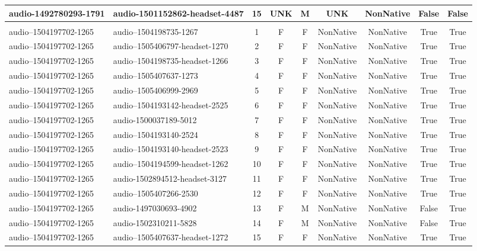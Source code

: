 {\begin{longtable}{p{2.1cm} p{2.1cm} c cccc cc}
audio-1492780293-1791 & audio-1501152862-headset-4487 & 15 & UNK & M & UNK & NonNative & False & False \\
\midrule
 &  &  &  &  &  &  &  & \\ %
\midrule
audio--1504197702-1265 & audio--1504198735-1267 & 1 & F & F & NonNative & NonNative & True & True \\
audio--1504197702-1265 & audio--1505406797-headset-1270 & 2 & F & F & NonNative & NonNative & True & True \\
audio--1504197702-1265 & audio--1504198735-headset-1266 & 3 & F & F & NonNative & NonNative & True & True \\
audio--1504197702-1265 & audio--1505407637-1273 & 4 & F & F & NonNative & NonNative & True & True \\
audio--1504197702-1265 & audio--1505406999-2969 & 5 & F & F & NonNative & NonNative & True & True \\
audio--1504197702-1265 & audio--1504193142-headset-2525 & 6 & F & F & NonNative & NonNative & True & True \\
audio--1504197702-1265 & audio-1500037189-5012 & 7 & F & F & NonNative & NonNative & True & True \\
audio--1504197702-1265 & audio--1504193140-2524 & 8 & F & F & NonNative & NonNative & True & True \\
audio--1504197702-1265 & audio--1504193140-headset-2523 & 9 & F & F & NonNative & NonNative & True & True \\
audio--1504197702-1265 & audio--1504194599-headset-1262 & 10 & F & F & NonNative & NonNative & True & True \\
audio--1504197702-1265 & audio-1502894512-headset-3127 & 11 & F & F & NonNative & NonNative & True & True \\
audio--1504197702-1265 & audio--1505407266-2530 & 12 & F & F & NonNative & NonNative & True & True \\
audio--1504197702-1265 & audio-1497030693-4902 & 13 & F & M & NonNative & NonNative & False & True \\
audio--1504197702-1265 & audio-1502310211-5828 & 14 & F & M & NonNative & NonNative & False & True \\
audio--1504197702-1265 & audio--1505407637-headset-1272 & 15 & F & F & NonNative & NonNative & True & True \\
\bottomrule
\end{longtable}
}
\vspace{0.1cm}
